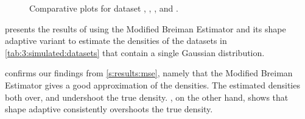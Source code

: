 
\begin{figure}
	\centering
	
	\caption{Comparative plots for dataset \ferdosiOneNum, \baakmanOneNum, \baakmanFourNum, and \baakmanFiveNum.
	}
	\label{fig:4:results:singleSphere}
\end{figure}

	 presents the results of using the Modified Breiman Estimator and its shape adaptive variant to estimate the densities of the datasets in \cref{tab:3:simulated:datasets} that contain a single Gaussian distribution. 

	 confirms our findings from \cref{s:results:mse}, namely that the Modified Breiman Estimator gives a good approximation of the densities. The estimated densities both over, and undershoot the true density. , on the other hand, shows that shape adaptive \mbe consistently overshoots the true density. 

